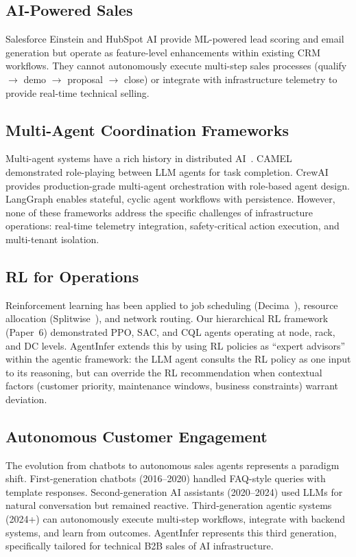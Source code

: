 \documentclass[conference,10pt,letterpaper]{IEEEtran}
\begin{document}
\subsection{AI-Powered Sales}

Salesforce Einstein and HubSpot AI provide ML-powered lead scoring and email generation but operate as feature-level enhancements within existing CRM workflows. They cannot autonomously execute multi-step sales processes (qualify $\to$ demo $\to$ proposal $\to$ close) or integrate with infrastructure telemetry to provide real-time technical selling.


\subsection{Multi-Agent Coordination Frameworks}

Multi-agent systems have a rich history in distributed AI~\cite{xi2023rise}. CAMEL~\cite{park2023generative} demonstrated role-playing between LLM agents for task completion. CrewAI provides production-grade multi-agent orchestration with role-based agent design. LangGraph enables stateful, cyclic agent workflows with persistence. However, none of these frameworks address the specific challenges of infrastructure operations: real-time telemetry integration, safety-critical action execution, and multi-tenant isolation.

\subsection{RL for Operations}

Reinforcement learning has been applied to job scheduling (Decima~\cite{mao2019learning}), resource allocation (Splitwise~\cite{kwon2023vllm}), and network routing. Our hierarchical RL framework (Paper~6) demonstrated PPO, SAC, and CQL agents operating at node, rack, and DC levels. AgentInfer extends this by using RL policies as ``expert advisors'' within the agentic framework: the LLM agent consults the RL policy as one input to its reasoning, but can override the RL recommendation when contextual factors (customer priority, maintenance windows, business constraints) warrant deviation.

\subsection{Autonomous Customer Engagement}

The evolution from chatbots to autonomous sales agents represents a paradigm shift. First-generation chatbots (2016--2020) handled FAQ-style queries with template responses. Second-generation AI assistants (2020--2024) used LLMs for natural conversation but remained reactive. Third-generation agentic systems (2024+) can autonomously execute multi-step workflows, integrate with backend systems, and learn from outcomes. AgentInfer represents this third generation, specifically tailored for technical B2B sales of AI infrastructure.
\end{document}
